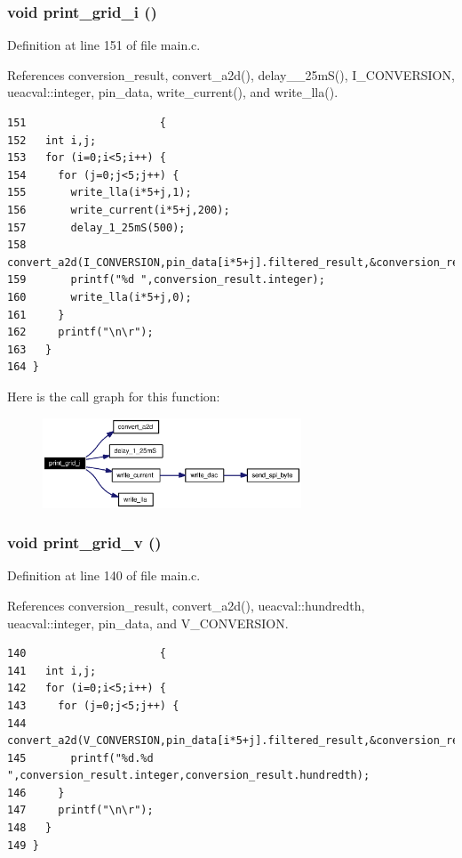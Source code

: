 \subsubsection{\setlength{\rightskip}{0pt plus 5cm}void print\_\-grid\_\-i ()}\label{main_8c_a2}




Definition at line 151 of file main.c.

References conversion\_\-result, convert\_\-a2d(), delay\_\_\-25m\-S(), I\_\-CONVERSION, ueacval::integer, pin\_\-data, write\_\-current(), and write\_\-lla().

\footnotesize\begin{verbatim}151                     {
152   int i,j;
153   for (i=0;i<5;i++) {
154     for (j=0;j<5;j++) {
155       write_lla(i*5+j,1);
156       write_current(i*5+j,200);
157       delay_1_25mS(500);
158       convert_a2d(I_CONVERSION,pin_data[i*5+j].filtered_result,&conversion_result,i*5+j); 
159       printf("%d ",conversion_result.integer);
160       write_lla(i*5+j,0);
161     }
162     printf("\n\r");
163   }
164 }
\end{verbatim}\normalsize 




Here is the call graph for this function:\begin{figure}[H]
\begin{center}
\leavevmode
\includegraphics[width=218pt]{main_8c_a2_cgraph}
\end{center}
\end{figure}
\subsubsection{\setlength{\rightskip}{0pt plus 5cm}void print\_\-grid\_\-v ()}\label{main_8c_a1}




Definition at line 140 of file main.c.

References conversion\_\-result, convert\_\-a2d(), ueacval::hundredth, ueacval::integer, pin\_\-data, and V\_\-CONVERSION.

\footnotesize\begin{verbatim}140                     {
141   int i,j;
142   for (i=0;i<5;i++) {
143     for (j=0;j<5;j++) {
144       convert_a2d(V_CONVERSION,pin_data[i*5+j].filtered_result,&conversion_result,i*5+j); 
145       printf("%d.%d ",conversion_result.integer,conversion_result.hundredth);
146     }
147     printf("\n\r");
148   }
149 }
\end{verbatim}\normalsize 




